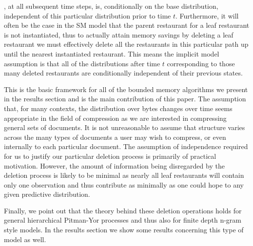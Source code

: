 , at all subsequent time steps, is, conditionally on the base distribution, independent of this particular distribution prior to time $t$.  Furthermore, it will often be the case in the SM model that the parent restaurant for a leaf restaurant is not instantiated, thus to actually attain memory savings by deleting a leaf restaurant we must effectively delete all the restaurants in this particular path up until the nearest instantiated restaurant.  This means the implicit model assumption is that all of the distributions after time $t$ corresponding to those many deleted restaurants are conditionally independent of their previous states.

This is the basic framework for all of the bounded memory algorithms we present in the results section and is the main contribution of this paper.  The assumption that, for many contexts, the distribution over bytes changes over time seems appropriate in the field of compression as we are interested in compressing general sets of documents. It is not unreasonable to assume that structure varies across the many types of documents a user may wish to compress, or even internally to each particular document.  The assumption of independence required for us to justify our particular deletion process is primarily of practical motivation.  However, the amount of information being disregarded by the deletion process is likely to be minimal as nearly all leaf restaurants will contain only one observation and thus contribute as minimally as one could hope to any given predictive distribution.

Finally, we point out that the theory behind these deletion operations holds for general hierarchical Pitman-Yor processes and thus also for finite depth n-gram style models.  In the results section we show some results concerning this type of model as well.
